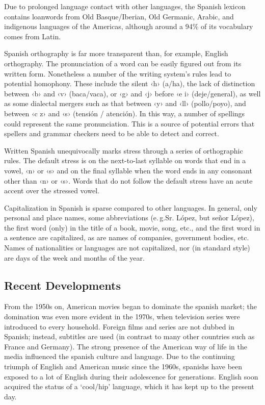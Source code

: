 \begin{multicols}{2}
Due to prolonged language contact with other languages, the Spanish lexicon contains loanwords from Old Basque/Iberian, Old Germanic, Arabic, and indigenous languages of the Americas, although around a 94\% of its vocabulary comes from Latin.


Spanish orthography is far more transparent than, for example, English orthography.  The pronunciation of a word can be easily figured out from its written form. Nonetheless a number of the writing system's rules lead to potential homophony. These include the silent ‹h› (a/ha), the lack of distinction between ‹b› and ‹v› (baca/vaca), or ‹g› and ‹j› before ‹e i› (deje/general), as well as some dialectal mergers such as that between ‹y› and ‹ll› (pollo/poyo), and between ‹c z› and ‹s› (tensión / atención). In this way, a number of spellings could represent the same pronunciation. This is a source of potential errors that spellers and grammar checkers need to be able to detect and correct.

Written Spanish unequivocally marks stress through a series of orthographic rules. The default stress is on the next-to-last syllable on words that end in a vowel, ‹n› or ‹s› and on the final syllable when the word ends in any consonant other than ‹n› or ‹s›. Words that do not follow the default stress have an acute accent over the stressed vowel.

Capitalization in Spanish is sparse compared to other languages. In general, only personal and place names, some abbreviations (e.\,g.Sr. López, but señor López), the first word (only) in the title of a book, movie, song, etc., and the first word in a sentence are capitalized, as are names of companies, government bodies, etc. Names of nationalities or languages are not capitalized, nor (in standard style) are days of the week and months of the year.

\subsection{Recent Developments}

From the 1950s on, American movies began to dominate the spanish market; the domination was even more evident in the 1970s, when television series were introduced to every household. Foreign films and series are not dubbed in Spanish; instead, subtitles are used (in contrast to many other countries such as France and Germany). The strong presence of the American way of life in the media influenced the spanish culture and language. Due to the continuing triumph of English and American music since the 1960s, spanishs have been exposed to a lot of English during their adolescence for generations. English soon acquired the status of a ‘cool/hip’ language, which it has kept up to the present day.


\end{multicols}
